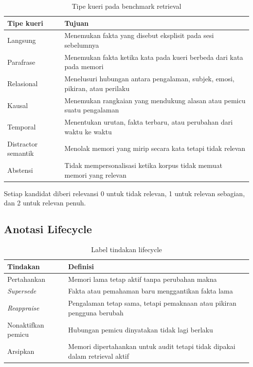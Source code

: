 \begin{table}[!htbp]
\centering
\caption{Tipe kueri pada benchmark retrieval}
{\footnotesize
\begin{tabularx}{\textwidth}{|>{\raggedright\arraybackslash}p{2.7cm}|>{\raggedright\arraybackslash}X|}
\hline
\rowcolor{tableheadgray}
\textbf{Tipe kueri} & \textbf{Tujuan} \\
\hline
Langsung & Menemukan fakta yang disebut eksplisit pada sesi sebelumnya \\
\hline
Parafrase & Menemukan fakta ketika kata pada kueri berbeda dari kata pada memori \\
\hline
Relasional & Menelusuri hubungan antara pengalaman, subjek, emosi, pikiran, atau perilaku \\
\hline
Kausal & Menemukan rangkaian yang mendukung alasan atau pemicu suatu pengalaman \\
\hline
Temporal & Menentukan urutan, fakta terbaru, atau perubahan dari waktu ke waktu \\
\hline
Distractor semantik & Menolak memori yang mirip secara kata tetapi tidak relevan \\
\hline
Abstensi & Tidak mempersonalisasi ketika korpus tidak memuat memori yang relevan \\
\hline
\end{tabularx}
}
\end{table}

Setiap kandidat diberi relevansi 0 untuk tidak relevan, 1 untuk relevan sebagian, dan 2 untuk relevan penuh.

\subsection{Anotasi Lifecycle}

\begin{table}[!htbp]
\centering
\caption{Label tindakan lifecycle}
{\footnotesize
\begin{tabularx}{\textwidth}{|>{\raggedright\arraybackslash}p{2.8cm}|>{\raggedright\arraybackslash}X|}
\hline
\rowcolor{tableheadgray}
\textbf{Tindakan} & \textbf{Definisi} \\
\hline
Pertahankan & Memori lama tetap aktif tanpa perubahan makna \\
\hline
\textit{Supersede} & Fakta atau pemahaman baru menggantikan fakta lama \\
\hline
\textit{Reappraise} & Pengalaman tetap sama, tetapi pemaknaan atau pikiran pengguna berubah \\
\hline
Nonaktifkan pemicu & Hubungan pemicu dinyatakan tidak lagi berlaku \\
\hline
Arsipkan & Memori dipertahankan untuk audit tetapi tidak dipakai dalam retrieval aktif \\
\hline
\end{tabularx}
}
\end{table}

